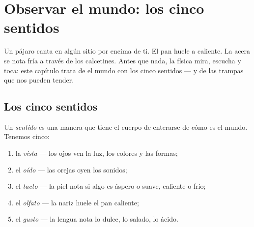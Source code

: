 \chapter{Observar el mundo: los cinco sentidos}\label{ch:g1:five-senses}

Un pájaro canta en algún sitio por encima de ti. El pan huele a
caliente. La acera se nota fría a través de los calcetines. Antes que
nada, la física mira, escucha y toca: este capítulo trata de 
el mundo con los cinco sentidos --- y de las trampas que nos pueden
tender.

\section{Los cinco sentidos}

\begin{definition}\label{def:g1:five-senses:senses}
Un \emph{sentido} es una manera que tiene el cuerpo de
enterarse de cómo es el mundo. Tenemos cinco:
\begin{enumerate}
  \item la \emph{vista} --- los ojos ven la luz, los
        colores y las formas;
  \item el \emph{oído} --- las orejas oyen los sonidos;
  \item el \emph{tacto} --- la piel nota si algo es
        áspero o suave, caliente o frío;
  \item el \emph{olfato} --- la nariz huele el pan
        caliente;
  \item el \emph{gusto} --- la lengua nota lo dulce, lo
        salado, lo ácido.
\end{enumerate}
\end{definition}

